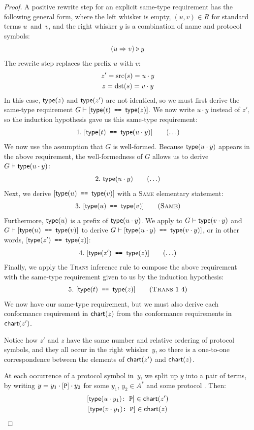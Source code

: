 \documentclass[../generics]{subfiles}
\begin{document}
\begin{proof}
 A positive rewrite step for an explicit same-type requirement has the following general form, where the left whisker is empty, $(u,v)\in R$ for standard terms $u$~and~$v$, and the right whisker $y$ is a combination of name and protocol symbols:
\[(u\Rightarrow v)\triangleright y\]
The rewrite step replaces the prefix $u$ with $v$:
\begin{gather*}
z'=\operatorname{src}(s)=u\cdot y\\
z=\operatorname{dst}(s)=v\cdot y
\end{gather*}
In this case, $\mathsf{type}(z)$ and $\mathsf{type}(z')$ are not identical, so we must first derive the same-type requirement $G\vdash[\texttt{$\mathsf{type}(t)$ == $\mathsf{type}(z)$}]$. We now write $u\cdot y$ instead of $z'$, so the induction hypothesis gave us this same-type requirement:
\[ \AnyStep{\SameReq{$\Type(t)$}{$\Type(u\cdot y)$}}{1} \]
We now use the assumption that $G$ is well-formed. Because $\mathsf{type}(u\cdot y)$ appears in the above requirement, the well-formedness of $G$ allows us to derive $G\vdash\mathsf{type}(u\cdot y)$:
\[ \AnyStep{\Type(u\cdot y)}{2} \]
Next, we derive $[\texttt{$\mathsf{type}(u)$ == $\mathsf{type}(v)$}]$ with a \textsc{Same} elementary statement:
\[ \SameStep{$\Type(u)$}{$\Type(v)$}{3} \]
Furthermore, $\mathsf{type}(u)$ is a prefix of $\mathsf{type}(u\cdot y)$. We apply  to $G\vdash\texttt{$\mathsf{type}(v\cdot y)$}$ and $G\vdash[\texttt{$\mathsf{type}(u)$ == $\mathsf{type}(v)$}]$ to derive $G\vdash[\texttt{$\mathsf{type}(u\cdot y)$ == $\mathsf{type}(v\cdot y)$}]$, or in other words, $[\texttt{$\mathsf{type}(z')$ == $\mathsf{type}(z)$}]$:
\[
\AnyStep{\SameReq{$\Type(z')$}{$\Type(z)$}}{4}
\]
Finally, we apply the \textsc{Trans} inference rule to compose the above requirement with the same-type requirement given to us by the induction hypothesis:
\[
\TransStep{1}{4}{$\Type(t)$}{$\Type(z)$}{5}
\]
We now have our same-type requirement, but we must also derive each conformance requirement in $\mathsf{chart}(z)$ from the conformance requirements in $\mathsf{chart}(z')$.

Notice how $z'$ and $z$ have the same number and relative ordering of protocol symbols, and they all occur in the right whisker~$y$, so there is a one-to-one correspondence between the elements of $\mathsf{chart}(z')$ and $\mathsf{chart}(z)$.

At each occurrence of a protocol symbol in~$y$, we split up $y$ into a pair of terms, by writing $y=y_1\cdot[\texttt{P}]\cdot y_2$ for some $y_1$, $y_2\in A^*$ and some protocol \tP. Then:
\begin{gather*}
\ConfReq{$\Type(u\cdot y_1)$}{P}\in\Chart(z')\\
\ConfReq{$\Type(v\cdot y_1)$}{P}\in\Chart(z)
\end{gather*}


\end{proof}
\end{document}
